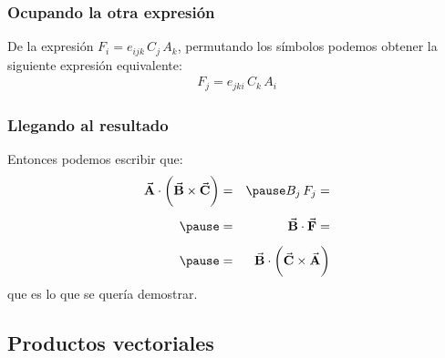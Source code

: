 \documentclass[12pt]{beamer}
\begin{document}
\begin{frame}
\frametitle{Ocupando la otra expresión}
De la expresión $F_{i} = e_{ijk} \, C_{j} \, A_{k}$, \pause permutando los símbolos podemos obtener la siguiente expresión equivalente:
\pause
\begin{align*}
F_{j} = e_{jki} \, C_{k} \, A_{i}
\end{align*}
\end{frame}
\begin{frame}
\frametitle{Llegando al resultado}
Entonces podemos escribir que:
\pause
\begin{eqnarray*}
\va{A} \cdot \bigg( \va{B} \times \va{C} \bigg) &=& \pause B_{j} \, F_{j} = \\[0.5em] \pause
&=& \va{B} \cdot \va{F} = \\[0.5em] \pause
&=& \va{B} \cdot \bigg( \va{C} \times \va{A} \bigg) 
\end{eqnarray*}
que es lo que se quería demostrar.
\end{frame}

\subsection{Productos vectoriales}
\end{document}
